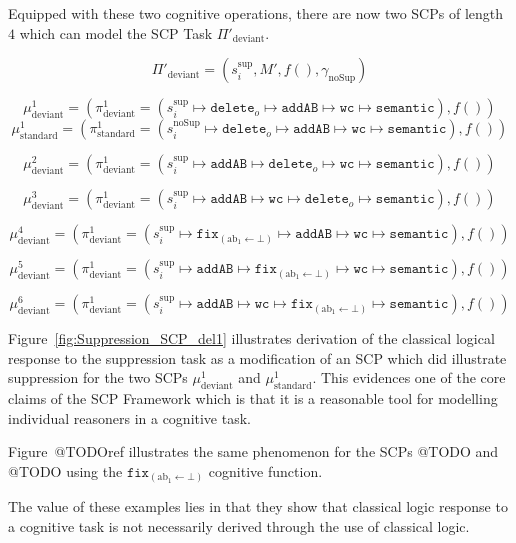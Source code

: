 Equipped with these two cognitive operations, there are now two SCPs of length $4$ which can model the SCP Task $\Pi'_\text{deviant}$.

\[\Pi'_\text{deviant}=(s_i^{\text{sup}},M',f(),\gamma_{\text{noSup}})\]

\[\mu^1_\text{deviant}=(\pi^1_\text{deviant}=(s_i^{\text{sup}} \longmapsto \texttt{delete}_o \longmapsto \texttt{addAB} \longmapsto \texttt{wc} \longmapsto \texttt{semantic}),f())\]
\[\mu^1_\text{standard}=(\pi^1_\text{standard}=(s_i^{\text{noSup}} \longmapsto \texttt{delete}_o \longmapsto \texttt{addAB} \longmapsto \texttt{wc} \longmapsto \texttt{semantic}),f())\]


\[\mu^2_\text{deviant}=(\pi^1_\text{deviant}=(s_i^{\text{sup}} \longmapsto \texttt{addAB} \longmapsto \texttt{delete}_o \longmapsto \texttt{wc} \longmapsto \texttt{semantic}),f())\]


\[\mu^3_\text{deviant}=(\pi^1_\text{deviant}=(s_i^{\text{sup}} \longmapsto \texttt{addAB} \longmapsto \texttt{wc} \longmapsto  \texttt{delete}_o \longmapsto \texttt{semantic}),f())\]

\[\mu^4_\text{deviant}=(\pi^1_\text{deviant}=(s_i^{\text{sup}} \longmapsto \texttt{fix}_{(\text{ab}_1\leftarrow \bot)} \longmapsto \texttt{addAB} \longmapsto \texttt{wc} \longmapsto \texttt{semantic}),f())\]

\[\mu^5_\text{deviant}=(\pi^1_\text{deviant}=(s_i^{\text{sup}} \longmapsto \texttt{addAB} \longmapsto \texttt{fix}_{(\text{ab}_1\leftarrow \bot)} \longmapsto \texttt{wc} \longmapsto \texttt{semantic}),f())\]



\[\mu^6_\text{deviant}=(\pi^1_\text{deviant}=(s_i^{\text{sup}} \longmapsto \texttt{addAB} \longmapsto \texttt{wc} \longmapsto \texttt{fix}_{(\text{ab}_1\leftarrow \bot)} \longmapsto \texttt{semantic}),f())\]

Figure~\ref{fig:Suppression_SCP_del1} illustrates derivation of the classical logical response to the suppression task as a modification of an SCP which did illustrate suppression for the two SCPs $\mu^1_\text{deviant}$ and $\mu^1_\text{standard}$. This evidences one of the core claims of the SCP Framework which is that it is a reasonable tool for modelling individual reasoners in a cognitive task. 

Figure~@TODOref illustrates the same phenomenon for the SCPs @TODO and @TODO using the $\texttt{fix}_{(\text{ab}_1\leftarrow \bot)}$ cognitive function.

The value of these examples lies in that they show that classical logic response to a cognitive task is not necessarily derived through the use of classical logic.

